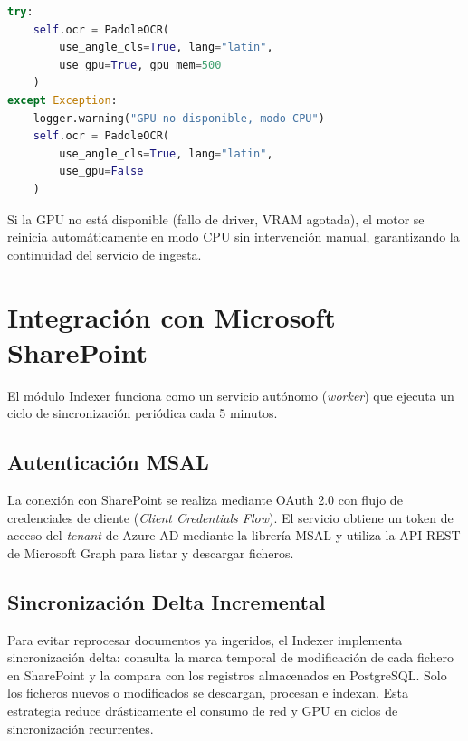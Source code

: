 \begin{lstlisting}[language=Python, caption={Inicialización de PaddleOCR con fallback GPU/CPU.}]
try:
    self.ocr = PaddleOCR(
        use_angle_cls=True, lang="latin",
        use_gpu=True, gpu_mem=500
    )
except Exception:
    logger.warning("GPU no disponible, modo CPU")
    self.ocr = PaddleOCR(
        use_angle_cls=True, lang="latin",
        use_gpu=False
    )
\end{lstlisting}

Si la GPU no está disponible (fallo de driver, VRAM agotada), el motor se reinicia automáticamente en modo CPU sin intervención manual, garantizando la continuidad del servicio de ingesta.

\section{Integración con Microsoft SharePoint}
\label{sec:sharepoint-impl}

El módulo Indexer funciona como un servicio autónomo (\textit{worker}) que ejecuta un ciclo de sincronización periódica cada 5 minutos.

\subsection{Autenticación MSAL}

La conexión con SharePoint se realiza mediante OAuth 2.0 con flujo de credenciales de cliente (\textit{Client Credentials Flow}). El servicio obtiene un token de acceso del \textit{tenant} de Azure AD mediante la librería MSAL y utiliza la API REST de Microsoft Graph para listar y descargar ficheros.

\subsection{Sincronización Delta Incremental}

Para evitar reprocesar documentos ya ingeridos, el Indexer implementa sincronización delta: consulta la marca temporal de modificación de cada fichero en SharePoint y la compara con los registros almacenados en PostgreSQL. Solo los ficheros nuevos o modificados se descargan, procesan e indexan. Esta estrategia reduce drásticamente el consumo de red y GPU en ciclos de sincronización recurrentes.

